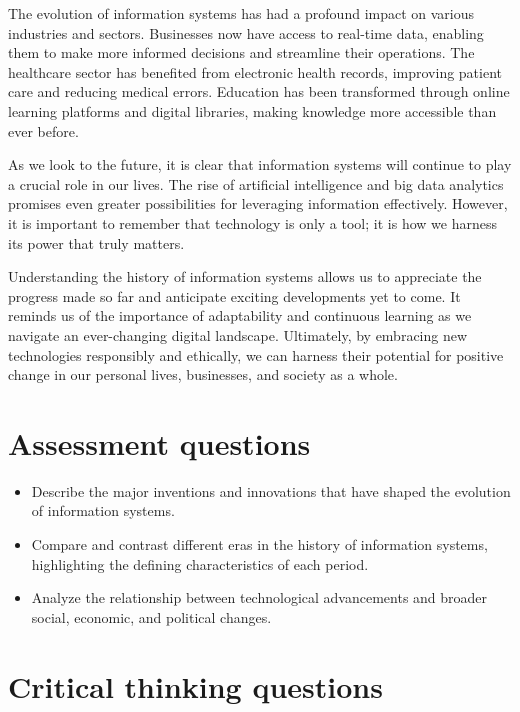 \documentclass[
  letterpaper,
  DIV=11,
  numbers=noendperiod]{scrreprt}
\providecommand{\tightlist}{%
  \setlength{\itemsep}{0pt}\setlength{\parskip}{0pt}}\usepackage{longtable,booktabs,array}
\begin{document}
The evolution of information systems has had a profound impact on
various industries and sectors. Businesses now have access to real-time
data, enabling them to make more informed decisions and streamline their
operations. The healthcare sector has benefited from electronic health
records, improving patient care and reducing medical errors. Education
has been transformed through online learning platforms and digital
libraries, making knowledge more accessible than ever before.

As we look to the future, it is clear that information systems will
continue to play a crucial role in our lives. The rise of artificial
intelligence and big data analytics promises even greater possibilities
for leveraging information effectively. However, it is important to
remember that technology is only a tool; it is how we harness its power
that truly matters.

Understanding the history of information systems allows us to appreciate
the progress made so far and anticipate exciting developments yet to
come. It reminds us of the importance of adaptability and continuous
learning as we navigate an ever-changing digital landscape. Ultimately,
by embracing new technologies responsibly and ethically, we can harness
their potential for positive change in our personal lives, businesses,
and society as a whole.

\section{Assessment questions}\label{assessment-questions}

\begin{itemize}
\tightlist
\item
  Describe the major inventions and innovations that have shaped the
  evolution of information systems.
\item
  Compare and contrast different eras in the history of information
  systems, highlighting the defining characteristics of each period.
\item
  Analyze the relationship between technological advancements and
  broader social, economic, and political changes.
\end{itemize}

\section{Critical thinking questions}\label{critical-thinking-questions}
\end{document}
